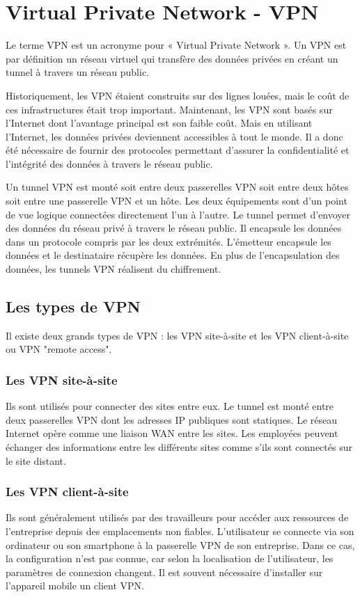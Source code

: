 \section{Virtual Private Network - VPN}
Le terme VPN est un acronyme pour « Virtual Private Network ».
Un VPN est par définition un réseau virtuel qui transfère des données privées en créant un tunnel à travers un réseau public.

Historiquement, les VPN étaient construits sur des lignes louées, mais le coût de ces infrastructures était trop important.
Maintenant, les VPN sont basés sur l'Internet dont l'avantage principal est son faible coût.
Mais en utilisant l'Internet, les données privées deviennent accessibles à tout le monde. 
Il a donc été nécessaire de fournir des protocoles permettant d'assurer la confidentialité et l'intégrité des données à travers le réseau public. 

Un tunnel VPN est monté soit entre deux passerelles VPN soit entre deux hôtes soit entre une passerelle VPN et un hôte. 
Les deux équipements sont d'un point de vue logique connectées directement l'un à l'autre. 
Le tunnel permet d'envoyer des données du réseau privé à travers le réseau public.
Il encapsule les données dans un protocole compris par les deux extrémités. 
L'émetteur encapsule les données et le destinataire récupère les données. 
En plus de l'encapsulation des données, les tunnels VPN réalisent du chiffrement. 

\subsection{Les types de VPN}
Il existe deux grands types de VPN : les VPN site-à-site et les VPN client-à-site ou VPN "remote access".

\subsubsection{Les VPN site-à-site} 
Ils sont utilisés pour connecter des sites entre eux. 
Le tunnel est monté entre deux passerelles VPN dont les adresses IP publiques sont statiques.
Le réseau Internet opère comme une liaison WAN entre les sites. 
Les employées peuvent échanger des informations entre les différents sites comme s'ils sont connectés sur le site distant. 

\subsubsection{Les VPN client-à-site} 
Ils sont généralement utilisés par des travailleurs pour accéder aux ressources de l'entreprise depuis des emplacements non fiables.  
L'utilisateur se connecte via son ordinateur ou son smartphone à la passerelle VPN de son entreprise.  
Dans ce cas, la configuration n'est pas connue, car selon la localisation de l'utilisateur, les paramètres de connexion changent.  
Il est souvent nécessaire d'installer sur l'appareil mobile un client VPN. 

